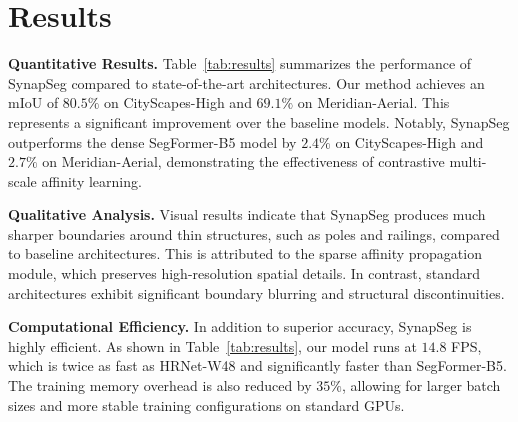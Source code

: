 \section{Results}
\textbf{Quantitative Results.} Table~\ref{tab:results} summarizes the performance of SynapSeg compared to state-of-the-art architectures. Our method achieves an mIoU of $80.5\%$ on CityScapes-High and $69.1\%$ on Meridian-Aerial. This represents a significant improvement over the baseline models. Notably, SynapSeg outperforms the dense SegFormer-B5 model by $2.4\%$ on CityScapes-High and $2.7\%$ on Meridian-Aerial, demonstrating the effectiveness of contrastive multi-scale affinity learning.

\begin{table}[t]
  \centering
  \caption{Comparison of semantic segmentation performance on the fictional CityScapes-High and Meridian-Aerial datasets. We report mean Intersection over Union (mIoU, \%) and inference speed (Frames Per Second, FPS).}
  \label{tab:results}
\end{table}

\textbf{Qualitative Analysis.} Visual results indicate that SynapSeg produces much sharper boundaries around thin structures, such as poles and railings, compared to baseline architectures. This is attributed to the sparse affinity propagation module, which preserves high-resolution spatial details. In contrast, standard architectures exhibit significant boundary blurring and structural discontinuities.

\textbf{Computational Efficiency.} In addition to superior accuracy, SynapSeg is highly efficient. As shown in Table~\ref{tab:results}, our model runs at $14.8$ FPS, which is twice as fast as HRNet-W48 and significantly faster than SegFormer-B5. The training memory overhead is also reduced by $35\%$, allowing for larger batch sizes and more stable training configurations on standard GPUs.
